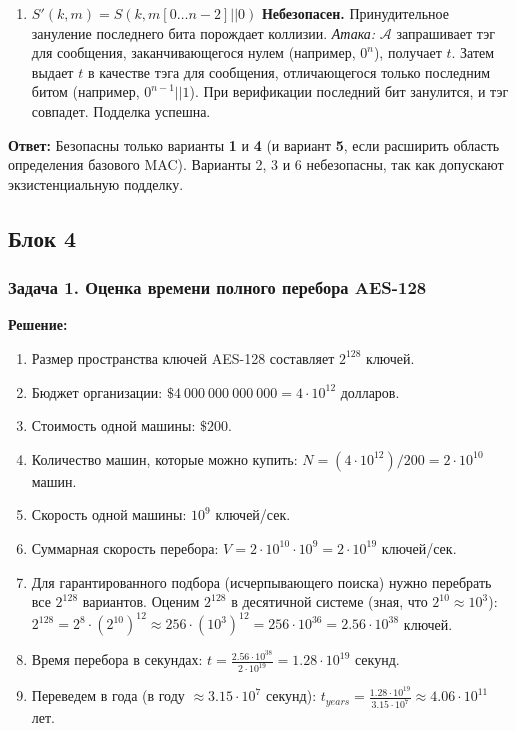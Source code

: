 ﻿\documentclass[9pt,a4paper]{extarticle}
\newcommand{\tightlist}{}
\begin{document}
\begin{enumerate}
\item
  \textbf{\(S'(k, m) = S(k, m[0\dots n-2] || 0)\)} \textbf{Небезопасен.} Принудительное зануление последнего бита порождает коллизии. \emph{Атака:} \(\mathcal{A}\) запрашивает тэг для сообщения, заканчивающегося нулем (например, \(0^n\)), получает \(t\). Затем выдает \(t\) в качестве тэга для сообщения, отличающегося только последним битом (например, \(0^{n-1}||1\)). При верификации последний бит занулится, и тэг совпадет. Подделка успешна.
\end{enumerate}

\textbf{Ответ:} Безопасны только варианты \textbf{1} и \textbf{4} (и вариант \textbf{5}, если расширить область определения базового MAC). Варианты 2, 3 и 6 небезопасны, так как допускают экзистенциальную подделку.

\subsection{Блок 4}\label{ux431ux43bux43eux43a-4}

\subsubsection{Задача 1. Оценка времени полного перебора AES-128}\label{ux437ux430ux434ux430ux447ux430-1.-ux43eux446ux435ux43dux43aux430-ux432ux440ux435ux43cux435ux43dux438-ux43fux43eux43bux43dux43eux433ux43e-ux43fux435ux440ux435ux431ux43eux440ux430-aes-128}

\textbf{Решение:}

\begin{enumerate}
\def\labelenumi{\arabic{enumi}.}
\tightlist
\item
  Размер пространства ключей AES-128 составляет \(2^{128}\) ключей.
\item
  Бюджет организации: \(\$4\ 000\ 000\ 000\ 000 = 4 \cdot 10^{12}\) долларов.
\item
  Стоимость одной машины: \(\$200\).
\item
  Количество машин, которые можно купить: \(N = (4 \cdot 10^{12}) / 200 = 2 \cdot 10^{10}\) машин.
\item
  Скорость одной машины: \(10^9\) ключей/сек.
\item
  Суммарная скорость перебора: \(V = 2 \cdot 10^{10} \cdot 10^9 = 2 \cdot 10^{19}\) ключей/сек.
\item
  Для гарантированного подбора (исчерпывающего поиска) нужно перебрать все \(2^{128}\) вариантов. Оценим \(2^{128}\) в десятичной системе (зная, что \(2^{10} \approx 10^3\)): \(2^{128} = 2^8 \cdot (2^{10})^{12} \approx 256 \cdot (10^3)^{12} = 256 \cdot 10^{36} = 2.56 \cdot 10^{38}\) ключей.
\item
  Время перебора в секундах: \(t = \frac{2.56 \cdot 10^{38}}{2 \cdot 10^{19}} = 1.28 \cdot 10^{19}\) секунд.
\item
  Переведем в года (в году \(\approx 3.15 \cdot 10^7\) секунд): \(t_{years} = \frac{1.28 \cdot 10^{19}}{3.15 \cdot 10^7} \approx 4.06 \cdot 10^{11}\) лет.
\end{enumerate}
\end{document}

